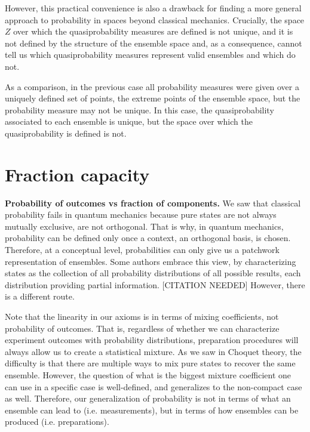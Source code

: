 \documentclass[10pt,twocolumn, nofootinbib]{revtex4-2}
\begin{document}
However, this practical convenience is also a drawback for finding a more general approach to probability in spaces beyond classical mechanics. Crucially, the space $Z$ over which the quasiprobability measures are defined is not unique, and it is not defined by the structure of the ensemble space and, as a consequence, cannot tell us which quasiprobability measures represent valid ensembles and which do not.

As a comparison, in the previous case all probability measures were given over a uniquely defined set of points, the extreme points of the ensemble space, but the probability measure may not be unique. In this case, the quasiprobability associated to each ensemble is unique, but the space over which the quasiprobability is defined is not.

\section{Fraction capacity}

\textbf{Probability of outcomes vs fraction of components.} We saw that classical probability fails in quantum mechanics because pure states are not always mutually exclusive, are not orthogonal. That is why, in quantum mechanics, probability can be defined only once a context, an orthogonal basis, is chosen. Therefore, at a conceptual level, probabilities can only give us a patchwork representation of ensembles. Some authors embrace this view, by characterizing states as the collection of all probability distributions of all possible results, each distribution providing partial information. [CITATION NEEDED] However, there is a different route.

Note that the linearity in our axioms is in terms of mixing coefficients, not probability of outcomes. That is, regardless of whether we can characterize experiment outcomes with probability distributions, preparation procedures will always allow us to create a statistical mixture. As we saw in Choquet theory, the difficulty is that there are multiple ways to mix pure states to recover the same ensemble. However, the question of what is the biggest mixture coefficient one can use in a specific case is well-defined, and generalizes to the non-compact case as well. Therefore, our generalization of probability is not in terms of what an ensemble can lead to (i.e. measurements), but in terms of how ensembles can be produced (i.e. preparations).
\end{document}
